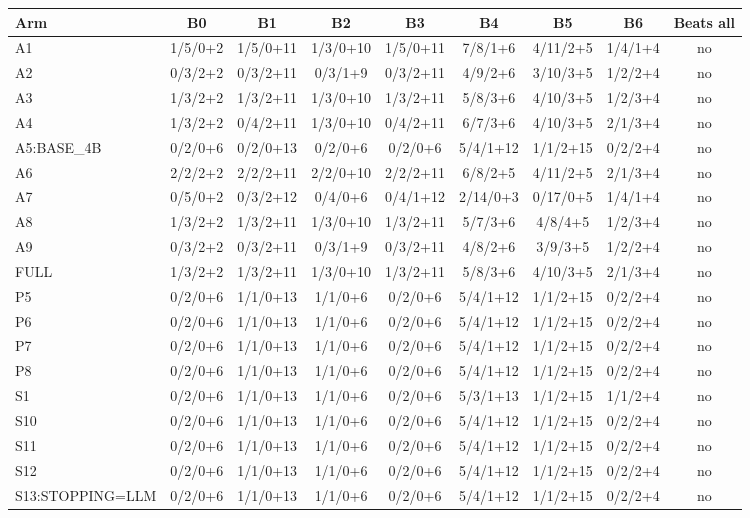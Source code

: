\begin{table}[!t]
\centering\small
\begin{adjustbox}{max width=\textwidth}
\begin{tabular}{@{}lcccccccc@{}}
\toprule
Arm & B0 & B1 & B2 & B3 & B4 & B5 & B6 & Beats all \\
\midrule
A1 & 1/5/0+2 & 1/5/0+11 & 1/3/0+10 & 1/5/0+11 & 7/8/1+6 & 4/11/2+5 & 1/4/1+4 & no \\
A2 & 0/3/2+2 & 0/3/2+11 & 0/3/1+9 & 0/3/2+11 & 4/9/2+6 & 3/10/3+5 & 1/2/2+4 & no \\
A3 & 1/3/2+2 & 1/3/2+11 & 1/3/0+10 & 1/3/2+11 & 5/8/3+6 & 4/10/3+5 & 1/2/3+4 & no \\
A4 & 1/3/2+2 & 0/4/2+11 & 1/3/0+10 & 0/4/2+11 & 6/7/3+6 & 4/10/3+5 & 2/1/3+4 & no \\
A5:BASE\_4B & 0/2/0+6 & 0/2/0+13 & 0/2/0+6 & 0/2/0+6 & 5/4/1+12 & 1/1/2+15 & 0/2/2+4 & no \\
A6 & 2/2/2+2 & 2/2/2+11 & 2/2/0+10 & 2/2/2+11 & 6/8/2+5 & 4/11/2+5 & 2/1/3+4 & no \\
A7 & 0/5/0+2 & 0/3/2+12 & 0/4/0+6 & 0/4/1+12 & 2/14/0+3 & 0/17/0+5 & 1/4/1+4 & no \\
A8 & 1/3/2+2 & 1/3/2+11 & 1/3/0+10 & 1/3/2+11 & 5/7/3+6 & 4/8/4+5 & 1/2/3+4 & no \\
A9 & 0/3/2+2 & 0/3/2+11 & 0/3/1+9 & 0/3/2+11 & 4/8/2+6 & 3/9/3+5 & 1/2/2+4 & no \\
FULL & 1/3/2+2 & 1/3/2+11 & 1/3/0+10 & 1/3/2+11 & 5/8/3+6 & 4/10/3+5 & 2/1/3+4 & no \\
P5 & 0/2/0+6 & 1/1/0+13 & 1/1/0+6 & 0/2/0+6 & 5/4/1+12 & 1/1/2+15 & 0/2/2+4 & no \\
P6 & 0/2/0+6 & 1/1/0+13 & 1/1/0+6 & 0/2/0+6 & 5/4/1+12 & 1/1/2+15 & 0/2/2+4 & no \\
P7 & 0/2/0+6 & 1/1/0+13 & 1/1/0+6 & 0/2/0+6 & 5/4/1+12 & 1/1/2+15 & 0/2/2+4 & no \\
P8 & 0/2/0+6 & 1/1/0+13 & 1/1/0+6 & 0/2/0+6 & 5/4/1+12 & 1/1/2+15 & 0/2/2+4 & no \\
S1 & 0/2/0+6 & 1/1/0+13 & 1/1/0+6 & 0/2/0+6 & 5/3/1+13 & 1/1/2+15 & 1/1/2+4 & no \\
S10 & 0/2/0+6 & 1/1/0+13 & 1/1/0+6 & 0/2/0+6 & 5/4/1+12 & 1/1/2+15 & 0/2/2+4 & no \\
S11 & 0/2/0+6 & 1/1/0+13 & 1/1/0+6 & 0/2/0+6 & 5/4/1+12 & 1/1/2+15 & 0/2/2+4 & no \\
S12 & 0/2/0+6 & 1/1/0+13 & 1/1/0+6 & 0/2/0+6 & 5/4/1+12 & 1/1/2+15 & 0/2/2+4 & no \\
S13:STOPPING=LLM & 0/2/0+6 & 1/1/0+13 & 1/1/0+6 & 0/2/0+6 & 5/4/1+12 & 1/1/2+15 & 0/2/2+4 & no \\

\end{tabular}
\end{adjustbox}
\end{table}
